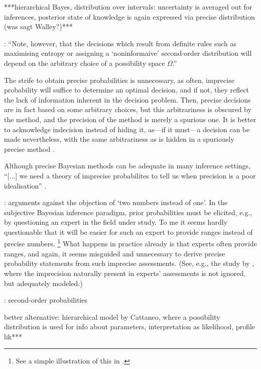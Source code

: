 ***hierarchical Bayes, distribution over intervals:
uncertainty is averaged out for inferences,
posterior state of knowledge is again expressed via precise distribution (was sagt Walley?)***

\cite[\S 5.6, footnote~16, p.~531]{1991:walley}:
``Note, however, that the decisions which result from definite rules
such as maximising entropy or assigning a `noninformaive' second-order distribution
will depend on the arbitrary choice of a possibility space $\Omega$.''

The strife to obtain precise probabilities is unnecessary,
as often, imprecise probability will suffice to determine an optimal decision,
and if not, they reflect the lack of information inherent in the decision problem.
Then, precise decisions are in fact based on some arbitrary choices,
but this arbitrariness is obscured by the method,
and the precision of the method is merely a spurious one.
It is better to acknowledge indecision instead of hiding it,
as---if it must---a decision can be made nevertheless,
with the same arbitrariness as is hidden in a spuriously precise method
\parencite[\S 5.7]{1991:walley}.

Although precise Bayesian methods can be adequate in many inference settings,
``[...] we need a theory of imprecise probabilites to tell us when precision is a poor idealisation''
\parencite[\S 5.8.1, item~3, p.~250]{1991:walley}.

\parencite[\S 5.8.2]{1991:walley}: arguments against the objection of `two numbers instead of one'.
In the subjective Bayesian inference paradigm,
prior probabilities must be elicited,
e.g., by questioning an expert in the field under study.
To me it seems hardly questionable that it will be easier for such an expert
to provide ranges instead of precise numbers.%
\footnote{See a simple illustration of this in \textcite[\S 5.8, footnote~7, p.~535]{1991:walley}.}
What happens in practice already is that experts often provide ranges,
and again, it seems misguided and unnecessary to derive precise probability statements
from such imprecise assessments.
(See, e.g., the study by \textcite{2011:rinderknecht},
where the imprecision naturally present in experts' assessments is not ignored,
but adequately modeled.)

\parencite[\S 5.10]{1991:walley}: second-order probabilities


better alternative: hierarchical model by Cattaneo,
where a possibility distribution is used for info about parameters,
interpretation as likelihood, profile lik***

